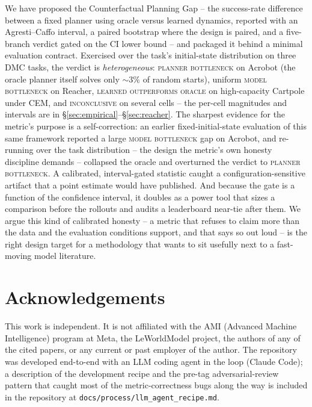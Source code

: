 \documentclass[10pt,letterpaper]{article}
\begin{document}
We have proposed the Counterfactual Planning Gap -- the success-rate difference between a fixed planner using oracle versus learned dynamics, reported with an Agresti--Caffo interval, a paired bootstrap where the design is paired, and a five-branch verdict gated on the CI lower bound -- and packaged it behind a minimal evaluation contract. Exercised over the task's initial-state distribution on three DMC tasks, the verdict is \emph{heterogeneous}: \textsc{planner bottleneck} on Acrobot (the oracle planner itself solves only $\sim\!3\%$ of random starts), uniform \textsc{model bottleneck} on Reacher, \textsc{learned outperforms oracle} on high-capacity Cartpole under CEM, and \textsc{inconclusive} on several cells -- the per-cell magnitudes and intervals are in \S\ref{sec:empirical}--\S\ref{sec:reacher}. The sharpest evidence for the metric's purpose is a self-correction: an earlier fixed-initial-state evaluation of this same framework reported a large \textsc{model bottleneck} gap on Acrobot, and re-running over the task distribution -- the design the metric's own honesty discipline demands -- collapsed the oracle and overturned the verdict to \textsc{planner bottleneck}. A calibrated, interval-gated statistic caught a configuration-sensitive artifact that a point estimate would have published. And because the gate is a function of the confidence interval, it doubles as a power tool that sizes a comparison before the rollouts and audits a leaderboard near-tie after them. We argue this kind of calibrated honesty -- a metric that refuses to claim more than the data and the evaluation conditions support, and that says so out loud -- is the right design target for a methodology that wants to sit usefully next to a fast-moving model literature.

\section*{Acknowledgements}

This work is independent. It is not affiliated with the AMI (Advanced Machine Intelligence) program at Meta, the LeWorldModel project, the authors of any of the cited papers, or any current or past employer of the author. The repository was developed end-to-end with an LLM coding agent in the loop (Claude Code); a description of the development recipe and the pre-tag adversarial-review pattern that caught most of the metric-correctness bugs along the way is included in the repository at \texttt{docs/process/llm\_agent\_recipe.md}.



\end{document}
